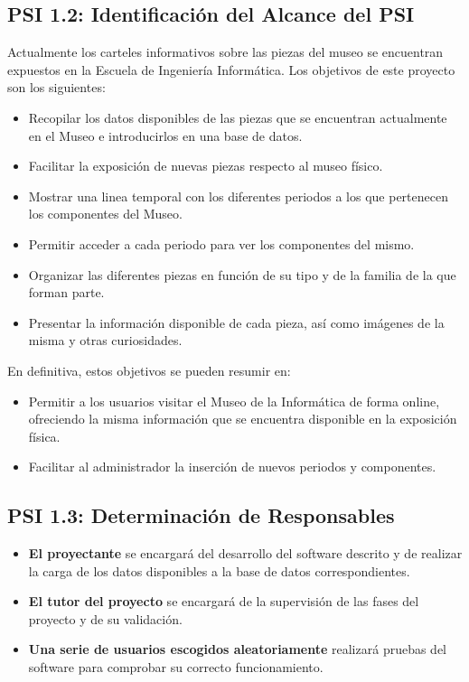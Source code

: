 \subsection{PSI 1.2: Identificación del Alcance del PSI}
Actualmente los carteles informativos sobre las piezas del museo se encuentran expuestos en la Escuela de Ingeniería Informática. Los objetivos de este proyecto son los siguientes:
\begin{itemize}
	\item Recopilar los datos disponibles de las piezas que se encuentran actualmente en el Museo e introducirlos en una base de datos.	
	\item Facilitar la exposición de nuevas piezas respecto al museo físico.
	\item Mostrar una linea temporal con los diferentes periodos a los que pertenecen los componentes del Museo. 
	\item Permitir acceder a cada periodo para ver los componentes del mismo.
	\item Organizar las diferentes piezas en función de su tipo y de la familia de la que forman parte.
	\item Presentar la información disponible de cada pieza, así como imágenes de la misma y otras curiosidades.
\end{itemize}
En definitiva, estos objetivos se pueden resumir en:
\begin{itemize}
	\item Permitir a los usuarios visitar el Museo de la Informática de forma online, ofreciendo la misma información que se encuentra disponible en la exposición física.
	\item Facilitar al administrador la inserción de nuevos periodos y componentes.
\end{itemize}

\subsection{PSI 1.3: Determinación de Responsables}
\begin{itemize}
	\item \textbf{El proyectante} se encargará del desarrollo del software descrito y de realizar la carga de los datos disponibles a la base de datos correspondientes.
	\item\textbf{El tutor del proyecto} se encargará de la supervisión de las fases del proyecto y de su validación.
	\item \textbf{Una serie de usuarios escogidos aleatoriamente} realizará pruebas del software para comprobar su correcto funcionamiento.
\end{itemize}


